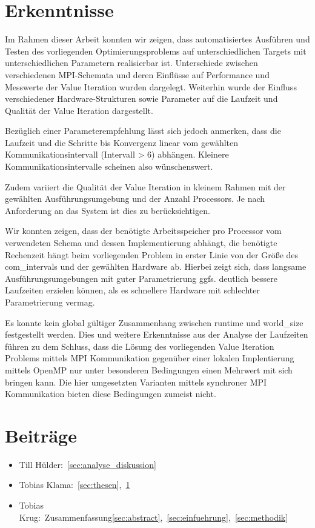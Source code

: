 \section{Erkenntnisse}
\label{sec:erkenntnisse}
Im Rahmen dieser Arbeit konnten wir zeigen, dass automatisiertes Ausführen und Testen des vorliegenden Optimierungsproblems
auf unterschiedlichen Targets mit unterschiedlichen Parametern realisierbar ist.
Unterschiede zwischen verschiedenen MPI-Schemata und deren Einflüsse auf Performance und Messwerte der Value Iteration wurden dargelegt.
Weiterhin wurde der Einfluss verschiedener Hardware-Strukturen sowie Parameter auf die Laufzeit und Qualität der Value Iteration dargestellt.

Bezüglich einer Parameterempfehlung lässt sich jedoch anmerken, dass die Laufzeit und die Schritte bis Konvergenz linear vom gewählten Kommunikationsintervall (Intervall > 6) abhängen. Kleinere Kommunikationsintervalle scheinen also wünschenswert.

Zudem variiert die Qualität der Value Iteration in kleinem Rahmen mit der gewählten Ausführungsumgebung und der Anzahl Processors. Je nach Anforderung an das System ist dies zu berücksichtigen.

Wir konnten zeigen, dass der benötigte Arbeitsspeicher pro Processor vom verwendeten Schema und dessen Implementierung abhängt, die benötigte Rechenzeit hängt beim vorliegenden Problem in erster Linie von der Größe des com\_intervals und der gewählten Hardware ab. Hierbei zeigt sich, dass langsame Ausführungsumgebungen mit guter Parametrierung ggfs. deutlich bessere Laufzeiten erzielen können, als es schnellere Hardware mit schlechter Parametrierung vermag.

Es konnte kein global gültiger Zusammenhang zwischen runtime und world\_size festgestellt werden. Dies und weitere Erkenntnisse aus der Analyse der Laufzeiten führen zu dem Schluss, dass die Lösung des vorliegenden Value Iteration Problems mittels MPI Kommunikation gegenüber einer lokalen Implentierung mittels OpenMP nur unter besonderen Bedingungen einen Mehrwert mit sich bringen kann. Die hier umgesetzten Varianten mittels synchroner MPI Kommunikation bieten diese Bedingungen zumeist nicht.

\section{Beiträge}
\label{sec:beitraege}

\begin{itemize}
    \item Till Hülder:~\ref{sec:analyse_diskussion}
    \item Tobias Klama:~\ref{sec:thesen},~\ref{sec:erkenntnisse}
    \item Tobias Krug:~Zusammenfassung\ref{sec:abstract},~\ref{sec:einfuehrung},~\ref{sec:methodik}
\end{itemize}